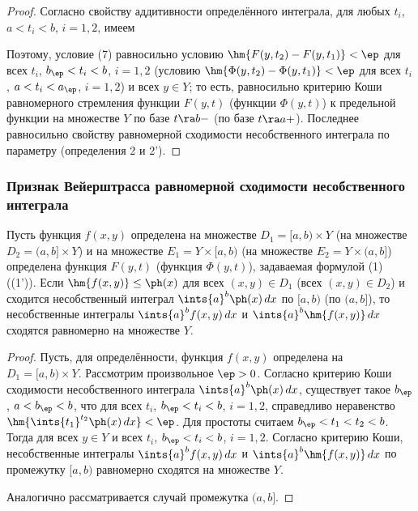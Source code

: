 \documentclass[a4paper]{article}
\begin{document}
\begin{proof}
Согласно свойству аддитивности определённого интеграла, для любых
$t_i$, $a<t_i<b$, $i=1,2$, имеем  

Поэтому, условие (7) равносильно условию
$\hm{F(y,t_2)-F(y,t_1)}<\ep$ для всех $t_i$, $b_{\ep}<t_i<b$,
$i=1,2$ (условию $\hm{\Phi(y,t_2)-\Phi(y,t_1)}<\ep$ для всех $t_i$,
$a<t_i<a_{\ep}$, $i=1,2$) и всех $y\in Y$; то есть, равносильно
критерию Коши равномерного стремления функции $F(y,t)$ (функции
$\Phi(y,t)$) к предельной функции на множестве $Y$ по базе $t\ra b-$
(по базе $t\ra a+$). Последнее равносильно свойству равномерной
сходимости несобственного интеграла по параметру (определения 2 и
2').
\end{proof}

\subsubsection{Признак Вейерштрасса равномерной сходимости
несобственного интеграла}

\begin{theorem}
Пусть функция $f(x,y)$ определена на множестве $D_1 = [a,b)\times Y$
(на множестве $D_2=(a,b]\times Y$) и на множестве $E_1=Y\times[a,b)$
(на множестве $E_2=Y\times(a,b]$) определена функция $F(y,t)$
(функция $\Phi(y,t)$), задаваемая формулой (1) ((1')). Если
$\hm{f(x,y)}\le\ph(x)$ для всех $(x,y)\in D_1$ (всех $(x,y)\in D_2$)
и сходится несобственный интеграл $\ints{a}^b \ph(x)\,dx$ по $[a,b)$
(по $(a,b]$), то несобственные интегралы $\ints{a}^b f(x,y)\,dx$ и
$\ints{a}^b \hm{f(x,y)}\,dx$ сходятся равномерно на множестве $Y$.
\end{theorem}

\begin{proof}
Пусть, для определённости, функция $f(x,y)$ определена на
$D_1=[a,b)\times Y$. Рассмотрим произвольное $\ep>0$. Согласно
критерию Коши сходимости несобственного интеграла $\ints{a}^b
\ph(x)\,dx$, существует такое $b_{\ep}$, $a<b_{\ep}<b$, что для всех
$t_i$, $b_{\ep}<t_i<b$, $i=1,2$, справедливо неравенство
$\hm{\ints{t_1}^{t_2} \ph(x)\,dx}<\ep$. Для простоты считаем
$b_{\ep}<t_1<t_2<b$. Тогда  для всех $y\in Y$ и всех
$t_i$, $b_{\ep}<t_i<b$, $i=1,2$. Согласно критерию Коши,
несобственные интегралы $\ints{a}^b f(x,y)\,dx$ и $\ints{a}^b
\hm{f(x,y)}\,dx$ по промежутку $[a,b)$ равномерно сходятся на
множестве $Y$.

Аналогично рассматривается случай промежутка $(a,b]$.
\end{proof}
\end{document}
